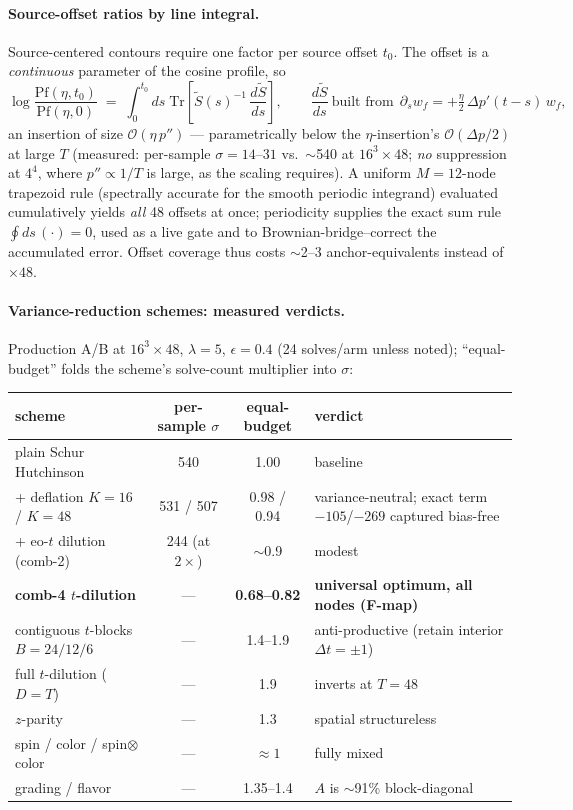 \documentclass[11pt]{article}
\begin{document}
\paragraph{Source-offset ratios by line integral.}
Source-centered contours require one factor per source offset $t_0$.
The offset is a \emph{continuous} parameter of the cosine profile, so
\begin{equation}
\log\frac{\mathrm{Pf}(\eta, t_0)}{\mathrm{Pf}(\eta, 0)}
\;=\; \int_0^{t_0} ds\;
\mathrm{Tr}\!\left[\tilde S(s)^{-1}\,\frac{d\tilde S}{ds}\right],
\qquad
\frac{d\tilde S}{ds}\ \text{built from}\ \
\partial_s w_f = +\tfrac{\eta}{2}\,\Delta p'(t{-}s)\,w_f ,
\end{equation}
an insertion of size $\mathcal{O}(\eta\,p'')$ --- parametrically below
the $\eta$-insertion's $\mathcal{O}(\Delta p/2)$ at large $T$
(measured: per-sample $\sigma = 14$--$31$ vs.\ $\sim$540 at
$16^3\times48$; \emph{no} suppression at $4^4$, where
$p''\propto 1/T$ is large, as the scaling requires).  A uniform
$M=12$-node trapezoid rule (spectrally accurate for the smooth periodic
integrand) evaluated cumulatively yields \emph{all} 48 offsets at once;
periodicity supplies the exact sum rule $\oint ds\,(\cdot) = 0$, used
as a live gate and to Brownian-bridge--correct the accumulated error.
Offset coverage thus costs $\sim$2--3 anchor-equivalents instead of
$\times 48$.

\paragraph{Variance-reduction schemes: measured verdicts.}
Production A/B at $16^3\times48$, $\lambda=5$, $\epsilon=0.4$
(24 solves/arm unless noted); ``equal-budget'' folds the scheme's
solve-count multiplier into $\sigma$:

\begin{center}
\begin{tabular}{lccl}
\toprule
scheme & per-sample $\sigma$ & equal-budget & verdict \\
\midrule
plain Schur Hutchinson & 540 & 1.00 & baseline \\
+ deflation $K{=}16$ / $K{=}48$ & 531 / 507 & 0.98 / 0.94 &
 variance-neutral; exact term $-105$/$-269$ captured bias-free \\
+ eo-$t$ dilution (comb-2) & 244 (at $2\times$) & $\sim$0.9 & modest \\
\textbf{comb-4 $t$-dilution} & --- & \textbf{0.68--0.82} &
 \textbf{universal optimum, all nodes (F-map)} \\
contiguous $t$-blocks $B{=}24/12/6$ & --- & 1.4--1.9 &
 anti-productive (retain interior $\Delta t{=}\pm1$) \\
full $t$-dilution ($D{=}T$) & --- & 1.9 & inverts at $T{=}48$ \\
$z$-parity & --- & 1.3 & spatial structureless \\
spin / color / spin$\otimes$color & --- & $\approx 1$ & fully mixed \\
grading / flavor & --- & 1.35--1.4 & $A$ is $\sim$91\% block-diagonal \\
\bottomrule
\end{tabular}
\end{center}
\end{document}
